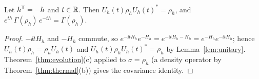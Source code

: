 \begin{corollary}\label{cor:stationary}
Let $h^{\mathsf T}=-h$ and $t\in\mathbb R$. Then $U_h(t)\rho_hU_h(t)^*=\rho_h$, and
$e^{th}\,\Gamma(\rho_h)\,e^{-th}=\Gamma(\rho_h)$.
\end{corollary}
\begin{proof}
$-\ii tH_h$ and $-H_h$ commute, so $e^{-\ii tH_h}e^{-H_h}=e^{-\ii tH_h-H_h}=e^{-H_h}e^{-\ii tH_h}$;
hence $U_h(t)\rho_h=\rho_hU_h(t)$ and $U_h(t)\rho_hU_h(t)^*=\rho_h$ by Lemma~\ref{lem:unitary}.
Theorem~\ref{thm:evolution}(c) applied to $\sigma=\rho_h$ (a density operator by
Theorem~\ref{thm:thermal}(b)) gives the covariance identity.
\end{proof}
